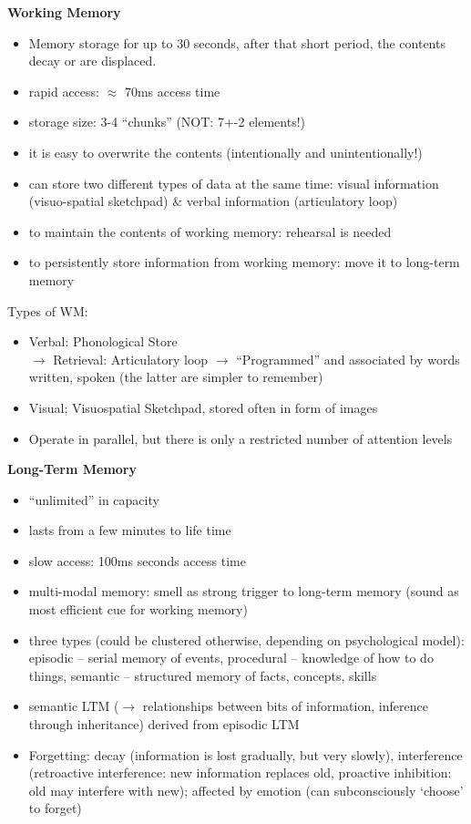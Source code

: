 \textbf{Working Memory}
\begin{itemize}
\item Memory storage for up to 30 seconds, after that short period, the contents decay or are displaced.
\item rapid access: $\approx$ 70ms access time
\item storage size: 3-4 ``chunks'' (NOT: 7+-2 elements!)
\item it is easy to overwrite the contents (intentionally and
unintentionally!)
\item can store two different types of data at the same time: visual information (visuo-spatial sketchpad) \& verbal information (articulatory loop)
\item to maintain the contents of working memory: rehearsal is needed
\item to persistently store information from working memory: move it to long-term memory
\end{itemize}
Types of WM:
\begin{itemize}
\item Verbal: Phonological Store\\
$\rightarrow$ Retrieval: Articulatory loop
$\rightarrow$ ``Programmed'' and associated by words written, spoken (the latter are simpler to remember)
\item Visual; Visuospatial Sketchpad, stored often in form of images
\item Operate in parallel, but there is only a restricted number of attention levels
\end{itemize}
\textbf{Long-Term Memory}
\begin{itemize}
\item ``unlimited'' in capacity
\item lasts from a few minutes to life time
\item slow access: 100ms seconds access time
\item multi-modal memory: smell as strong trigger to long-term memory (sound as most efficient cue for working memory)
\item three types (could be clustered otherwise, depending on psychological model): episodic – serial memory of events, procedural – knowledge of how to do things, semantic – structured memory of facts, concepts, skills
\item semantic LTM ($\rightarrow$ relationships between bits of information, inference through inheritance) derived from episodic LTM
\item Forgetting: decay (information is lost gradually, but very slowly), interference (retroactive interference: new information replaces old, proactive inhibition: old may interfere with new);  affected by emotion (can subconsciously `choose' to forget)
\end{itemize}
